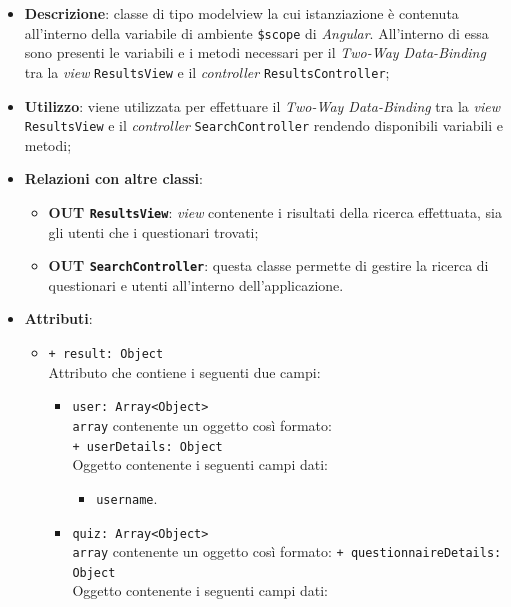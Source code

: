 	\begin{itemize}
		\item \textbf{Descrizione}: classe di tipo modelview la cui istanziazione è contenuta all'interno della variabile di ambiente \texttt{\$scope} di \textit{Angular}. All'interno di essa sono presenti le variabili e i metodi necessari per il \textit{Two-Way Data-Binding} tra la \textit{view} \texttt{ResultsView} e il \textit{controller} \texttt{ResultsController};
		\item \textbf{Utilizzo}: viene utilizzata per effettuare il \textit{Two-Way Data-Binding} tra la \textit{view}\\ \texttt{ResultsView} e il \textit{controller} \texttt{SearchController} rendendo disponibili variabili e metodi;
		\item \textbf{Relazioni con altre classi}: 
		\begin{itemize}
			\item \textbf{OUT \texttt{ResultsView}}: \textit{view} contenente i risultati della ricerca effettuata, sia gli utenti che i questionari trovati; 
			\item \textbf{OUT \texttt{SearchController}}: questa classe permette di gestire la ricerca di questionari e utenti all'interno dell'applicazione.
		\end{itemize}
		\item \textbf{Attributi}: 
		\begin{itemize}
			\item \texttt{+ result: Object} \\ Attributo che contiene i seguenti due campi: 
			\begin{itemize}
				\item \texttt{user: Array<Object>}\\ 
				\texttt{array} contenente un oggetto così formato:\\
				\texttt{+ userDetails: Object} \\ 
				Oggetto contenente i seguenti campi dati:
				\begin{itemize}
					\item \texttt{username}.
				\end{itemize}
				\item \texttt{quiz: Array<Object>}\\ 
				\texttt{array} contenente un oggetto così formato:
				\texttt{+ questionnaireDetails: Object} \\ 
				Oggetto contenente i seguenti campi dati:
				\begin{itemize}

\end{itemize}
\end{itemize}
\end{itemize}
\end{itemize}
